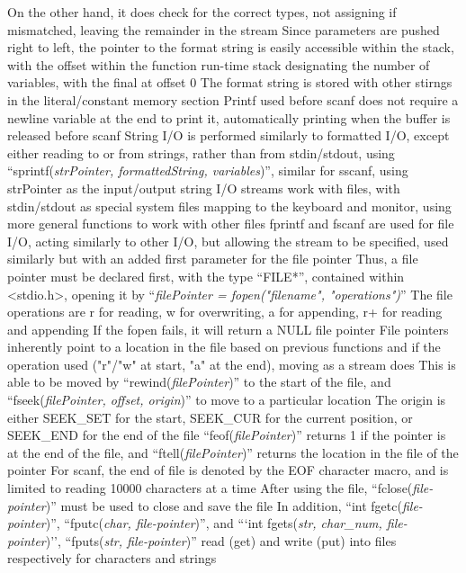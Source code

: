 \documentclass[11 pt, twoside]{article}
\newenvironment{outline*}
{
	\begin{outline}[enumerate]
	}
	{\end{outline}
}
\begin{document}
\begin{outline*}
\4 On the other hand, it does check for the correct types, not assigning if mismatched, leaving the remainder in the stream
\3 Since parameters are pushed right to left, the pointer to the format string is easily accessible within the stack, with the offset within the function run-time stack designating the number of variables, with the final at offset 0
\4 The format string is stored with other stirngs in the literal/constant memory section
\3 Printf used before scanf does not require a newline variable at the end to print it, automatically printing when the buffer is released before scanf
\2 String I/O is performed similarly to formatted I/O, except either reading to or from strings, rather than from stdin/stdout, using ``sprintf(\textit{strPointer, formattedString, variables})'', similar for sscanf, using strPointer as the input/output string
\1 I/O streams work with files, with stdin/stdout as special system files mapping to the keyboard and monitor, using more general functions to work with other files
\2 fprintf and fscanf are used for file I/O, acting similarly to other I/O, but allowing the stream to be specified, used similarly but with an added first parameter for the file pointer
\2 Thus, a file pointer must be declared first, with the type ``FILE*'', contained within <stdio.h>, opening it by ``\textit{filePointer = fopen("filename", "operations")}''
\3 The file operations are r for reading, w for overwriting, a for appending, r+ for reading and appending
\3 If the fopen fails, it will return a NULL file pointer
\3 File pointers inherently point to a location in the file based on previous functions and if the operation used ("r"/"w" at start, "a" at the end), moving as a stream does
\4 This is able to be moved by ``rewind(\textit{filePointer})'' to the start of the file, and ``fseek(\textit{filePointer, offset, origin})'' to move to a particular location
\4 The origin is either SEEK\_SET for the start, SEEK\_CUR for the current position, or SEEK\_END for the end of the file
\3 ``feof(\textit{filePointer})'' returns 1 if the pointer is at the end of the file, and ``ftell(\textit{filePointer})'' returns the location in the file of the pointer
\2 For scanf, the end of file is denoted by the EOF character macro, and is limited to reading 10000 characters at a time
\2 After using the file, ``fclose(\textit{file-pointer})'' must be used to close and save the file
\2 In addition, ``int fgetc(\textit{file-pointer})'', ``fputc(\textit{char, file-pointer})'', and ```int fgets(\textit{str, char\_num, file-pointer})'', ``fputs(\textit{str, file-pointer})'' read (get) and write (put) into files respectively for characters and strings

\end{outline*}
\end{document}

